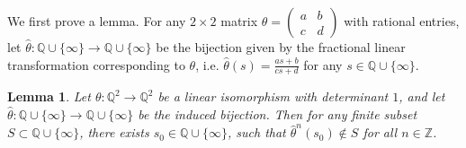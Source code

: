 \documentclass{amsart}
\numberwithin{equation}{section}
\newtheorem{lemma}[theorem]{Lemma}
\theoremstyle{definition}
\begin{document}
We first prove a lemma. For any $2\times 2$ matrix $\theta=
\begin{pmatrix}
a & b\\
c &d 
\end{pmatrix}$ with rational entries, let $\hat{\theta}: \mathbb{Q}\cup \{\infty\}\to \mathbb{Q}\cup \{\infty\}$ be the bijection given by the fractional linear transformation corresponding to $\theta$, i.e. $\hat{\theta}(s)=\frac{as+b}{cs+d}$ for any $s\in \mathbb{Q}\cup \{\infty\}$.

\begin{lemma}\label{ai}
Let $\theta:\mathbb{Q}^2\to \mathbb{Q}^2$ be a linear isomorphism with determinant $1$, and let $\hat{\theta}:\mathbb{Q}\cup \{\infty\}\to \mathbb{Q}\cup \{\infty\}$ be the induced bijection. Then for any finite subset $S\subset \mathbb{Q}\cup \{\infty\}$, there exists $s_0\in \mathbb{Q}\cup \{\infty\}$, such that $\hat{\theta}^n(s_0)\notin S$ for all $n\in \mathbb{Z}$.
\end{lemma}
\end{document}
